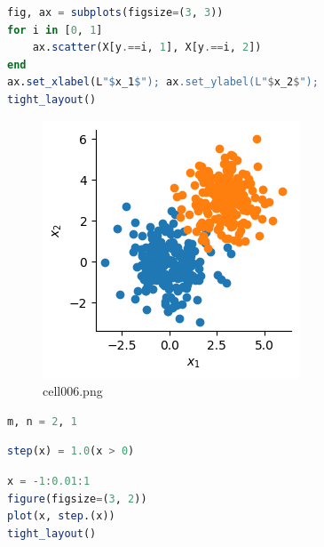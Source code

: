 \begin{lstlisting}[language=julia]
fig, ax = subplots(figsize=(3, 3))
for i in [0, 1]
    ax.scatter(X[y.==i, 1], X[y.==i, 2])
end
ax.set_xlabel(L"$x_1$"); ax.set_ylabel(L"$x_2$"); 
tight_layout()
\end{lstlisting}
\begin{figure}[ht]
	\centering
	\includegraphics[scale=0.8, max width=\linewidth]{./fig/local-learning-rule/logistic-regression-perceptron/cell006.png}
	\caption{cell006.png}
	\label{cell006.png}
\end{figure}
\begin{lstlisting}[language=julia]
m, n = 2, 1
\end{lstlisting}
\begin{lstlisting}[language=julia]
step(x) = 1.0(x > 0)
\end{lstlisting}
\begin{lstlisting}[language=julia]
x = -1:0.01:1
figure(figsize=(3, 2))
plot(x, step.(x))
tight_layout()
\end{lstlisting}
